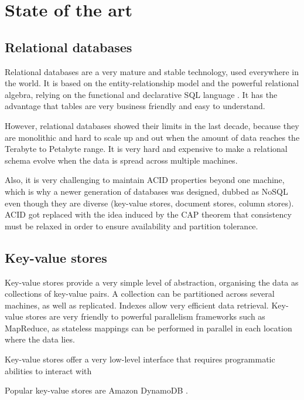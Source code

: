 \documentclass{vldb}
\begin{document}
\section{State of the art}
\label{section-state-of-the-art}

\subsection{Relational databases}

Relational databases are a very mature and stable technology, used everywhere in the world. It is based on the entity-relationship model and the powerful relational algebra, relying on the functional and declarative SQL language \cite{Chamberlin1974}. It has the advantage that tables are very business friendly and easy to understand.

However, relational databases showed their limits in the last decade, because they are monolithic and hard to scale up and out when the amount of data reaches the Terabyte to Petabyte range. It is very hard and expensive to make a relational schema evolve when the data is spread across multiple machines.

Also, it is very challenging to maintain ACID properties \cite{Haerder1983} beyond one machine, which is why a newer generation of databases was designed, dubbed as NoSQL even though they are diverse (key-value stores, document stores, column stores). ACID got replaced with the idea induced by the CAP theorem \cite{Gilbert2002} that consistency must be relaxed in order to ensure availability and partition tolerance.

\subsection{Key-value stores}

Key-value stores provide a very simple level of abstraction, organising the data as collections of key-value pairs. A collection can be partitioned across several machines, as well as replicated. Indexes allow very efficient data retrieval. Key-value stores are very friendly to powerful parallelism frameworks such as MapReduce, as stateless mappings can be performed in parallel in each location where the data lies.

Key-value stores offer a very low-level interface that requires programmatic abilities to interact with

Popular key-value stores are Amazon DynamoDB \cite{DeCandia2007}.
\end{document}
